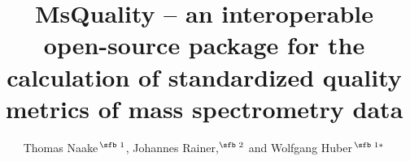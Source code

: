 \documentclass[unnumsec,webpdf,contemporary,large]{oup-authoring-template}%
\theoremstyle{thmstyleone}%
\theoremstyle{thmstyletwo}%
\theoremstyle{thmstylethree}%
\begin{document}
\sloppy





\title[MsQuality: Calculation of standardized quality metrics of mass spectrometry data]{MsQuality – an interoperable open-source package for the calculation of standardized quality metrics of mass spectrometry data}



\author[Naake \textit{et~al}.]{Thomas Naake\,$^{\text{\sfb 1}}$, Johannes Rainer,$^{\text{\sfb 2}}$ and Wolfgang Huber\,$^{\text{\sfb 1}*}$}




\address{
$^{\text{\sf 1}}$ Genome Biology Unit, European Molecular Biology Laboratory, Heidelberg, 69117, Germany \\
$^{\text{\sf 2}}$ Institute for Biomedicine (Affiliated to the University of L\"ubeck), Eurac Research, Viale Druso 1, 39100 Bolzano, Italy}






\end{document}
